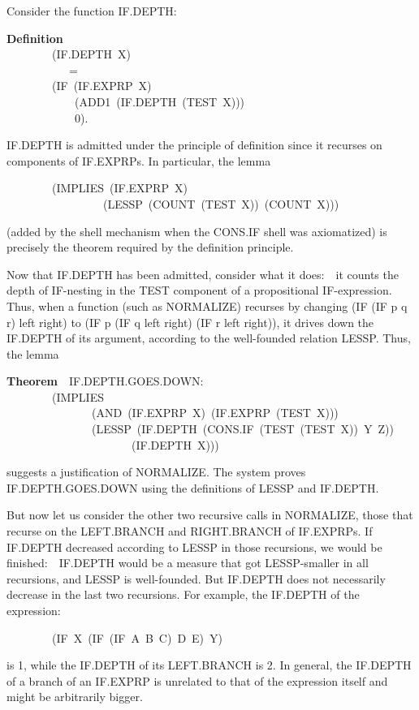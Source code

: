 \documentclass[10pt]{book}
\newenvironment{pubasis}{\begin{flushleft}}{\end{flushleft}}
\newcommand{\axiomordefinition}[1]{\vspace{6pt}\Large\textsf{\textbf{#1}}\normalsize}
\begin{document}
Consider the function IF.DEPTH:
\begin{pubasis}
\axiomordefinition{Definition}\\
~~~~~~~~(IF.DEPTH~X)\\
~~~~~~~~~~~=\\
~~~~~~~~(IF~(IF.EXPRP~X)\\
~~~~~~~~~~~~(ADD1~(IF.DEPTH~(TEST~X)))\\
~~~~~~~~~~~~0).\\
\end{pubasis}
IF.DEPTH is admitted under the principle of definition since it recurses
on components of IF.EXPRPs.  In particular, the lemma
\begin{pubasis}
~~~~~~~~(IMPLIES~(IF.EXPRP~X)\\
~~~~~~~~~~~~~~~~~(LESSP~(COUNT~(TEST~X))~(COUNT~X)))\\
\end{pubasis}
(added by the shell mechanism when the CONS.IF shell
was axiomatized) is precisely the theorem required by the definition
principle.

Now that IF.DEPTH has been admitted, consider what it does:~~it counts the
depth of IF-nesting in the TEST component of a propositional
IF-expression.  Thus, when a function (such as NORMALIZE)
recurses by changing (IF (IF p q r) left right) to (IF p (IF q left right) (IF r left right)),
it drives down the IF.DEPTH of its argument, according to the well-founded
relation LESSP.  Thus, the lemma
\begin{pubasis}
\axiomordefinition{Theorem}~~IF.DEPTH.GOES.DOWN:\\
~~~~~~~~(IMPLIES\\
~~~~~~~~~~~~~~~(AND~(IF.EXPRP~X)~(IF.EXPRP~(TEST~X)))\\
~~~~~~~~~~~~~~~(LESSP~(IF.DEPTH~(CONS.IF~(TEST~(TEST~X))~Y~Z))\\
~~~~~~~~~~~~~~~~~~~~~~(IF.DEPTH~X)))\\
\end{pubasis}
suggests a justification of NORMALIZE.  The system proves IF.DEPTH.GOES.DOWN 
using the definitions of LESSP and IF.DEPTH.

But now let us consider the other two recursive calls in NORMALIZE,
those that recurse on the LEFT.BRANCH and RIGHT.BRANCH of
IF.EXPRPs.  If IF.DEPTH decreased according to LESSP in those recursions,
we would be finished:~~IF.DEPTH would be a measure that got
LESSP-smaller in all recursions, and LESSP is well-founded.
But IF.DEPTH does not necessarily decrease in the last two recursions.
For example, the IF.DEPTH of the expression:
\begin{pubasis}
~~~~~~~~(IF~X~(IF~(IF~A~B~C)~D~E)~Y)\\
\end{pubasis}
is 1, while the IF.DEPTH of its LEFT.BRANCH is 2.  In general, the IF.DEPTH
of a branch of an IF.EXPRP is unrelated to that of the expression itself
and might be arbitrarily bigger.
\end{document}
